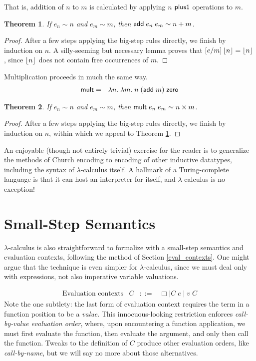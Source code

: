 \documentclass{amsbook}
\newtheorem{theorem}{Theorem}[chapter]
\theoremstyle{definition}
\theoremstyle{remark}
\numberwithin{section}{chapter}
\numberwithin{equation}{chapter}
\begin{document}
That is, addition of $n$ to $m$ is calculated by applying $n$ $\lc{plus1}$ operations to $m$.

\begin{theorem}\label{church_add}
  If $e_n \sim n$ and $e_m \sim m$, then $\lc{add} \; e_n \; e_m \sim n + m$.
\end{theorem}
\begin{proof}
  After a few steps applying the big-step rules directly, we finish by induction on $n$.
  A silly-seeming but necessary lemma proves that $\subst{\prechurch{n}}{m}{e} = \prechurch{n}$, since $\prechurch{n}$ does not contain free occurrences of $m$.
\end{proof}

Multiplication proceeds in much the same way.
\begin{eqnarray*}
  \lc{mult} &=& \lambda n. \; \lambda m. \; n \; (\lc{add} \; m) \; \lc{zero}
\end{eqnarray*}

\begin{theorem}
  If $e_n \sim n$ and $e_m \sim m$, then $\lc{mult} \; e_n \; e_m \sim n \times m$.
\end{theorem}
\begin{proof}
  After a few steps applying the big-step rules directly, we finish by induction on $n$, within which we appeal to Theorem \ref{church_add}.
\end{proof}

An enjoyable (though not entirely trivial) exercise for the reader is to generalize the methods of Church encoding to encoding of other inductive datatypes, including the syntax of $\lambda$-calculus itself.
A hallmark of a Turing-complete language is that it can host an interpreter for itself, and $\lambda$-calculus is no exception!


\section{Small-Step Semantics}

$\lambda$-calculus is also straightforward to formalize with a small-step semantics and evaluation contexts, following the method of Section \ref{eval_contexts}.
One might argue that the technique is even simpler for $\lambda$-calculus, since we must deal only with expressions, not also imperative variable valuations.

$$\begin{array}{rrcl}
  \textrm{Evaluation contexts} & C &::=& \Box \mid C \; e \mid v \; C
\end{array}$$
Note the one subtlety: the last form of evaluation context requires the term in a function position to be a \emph{value}.
This innocuous-looking restriction enforces \emph{call-by-value evaluation order}, where, upon encountering a function application, we must first evaluate the function, then evaluate the argument, and only then call the function.
Tweaks to the definition of $C$ produce other evaluation orders, like \emph{call-by-name}, but we will say no more about those alternatives.
\end{document}
